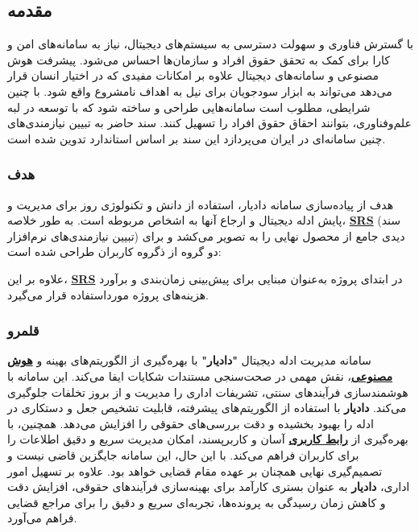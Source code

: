 \documentclass[12pt,a4paper,oneside]{article}
\begin{document}
	\subsection{مقدمه}	
		با گسترش فناوری و سهولت دسترسی به سیستم‌های دیجیتال، نیاز به سامانه‌های امن و کارا برای کمک به تحقق
	حقوق افراد و سازمان‌ها احساس می‌شود. پیشرفت هوش مصنوعی و سامانه‌های دیجیتال علاوه بر امکانات مفیدی
	که در اختیار انسان قرار می‌دهد می‌تواند به ابزار سودجویان برای نیل به اهداف نامشروع واقع شود. با چنین شرایطی،
	مطلوب است سامانه‌هایی طراحی و ساخته شود که با توسعه در لبه علم‌وفناوری، بتوانند احقاق حقوق افراد را تسهیل
	 کنند.	سند حاضر به تبیین نیازمندی‌های چنین سامانه‌ای 
		در ایران می‌پردازد این سند بر اساس استاندارد 
		تدوین شده است.
			\subsubsection{هدف}
			هدف از پیاده‌سازی سامانه دادیار، استفاده از دانش و تکنولوژی روز برای مدیریت و پایش ادله دیجیتال و ارجاع آنها به اشخاص مربوطه است. 
			به طور خلاصه، \hyperref[ref:srs]{\textbf{SRS}} (سند تبیین نیازمندی‌های نرم‌افزار) دیدی جامع 
				از محصول نهایی را به تصویر می‌کشد و برای دو گروه 
				از ذگروه کاربران طراحی شده است:

				علاوه بر این، \hyperref[ref:srs]{\textbf{SRS}} در ابتدای پروژه به‌عنوان مبنایی برای پیش‌بینی 
				زمان‌بندی و برآورد هزینه‌های پروژه مورداستفاده قرار می‌گیرد. 
			
			\subsubsection{قلمرو}

			سامانه مدیریت ادله دیجیتال \textbf{"دادیار"} با بهره‌گیری از الگوریتم‌های بهینه و \hyperref[ref:ai]{\textbf{هوش مصنوعی}}، نقش مهمی در صحت‌سنجی مستندات شکایات ایفا می‌کند. این سامانه با هوشمند\-سازی فرآیندهای سنتی، تشریفات اداری را مدیریت و از بروز تخلفات جلوگیری می‌کند.  
			\textbf{دادیار} با استفاده از الگوریتم‌های پیشرفته، قابلیت تشخیص جعل و دستکاری در ادله را بهبود بخشیده و دقت بررسی‌های حقوقی را افزایش می‌دهد. همچنین، با بهره‌گیری از \hyperref[ref:gui]{\textbf{رابط کاربری}} آسان و کاربرپسند، امکان مدیریت سریع و دقیق‌ اطلاعات را برای کاربران فراهم می‌کند. با این حال، این سامانه جایگزین قاضی نیست و تصمیم‌گیری نهایی همچنان بر عهده مقام قضایی خواهد بود.  
			علاوه بر تسهیل امور اداری، \textbf{دادیار} به عنوان بستری کارآمد برای بهینه‌سازی فرآیندهای حقوقی، افزایش دقت و کاهش زمان رسیدگی به پرونده‌ها، تجربه‌ای سریع‌ و دقیق‌ را برای مراجع قضایی فراهم می‌آورد.
\end{document}
